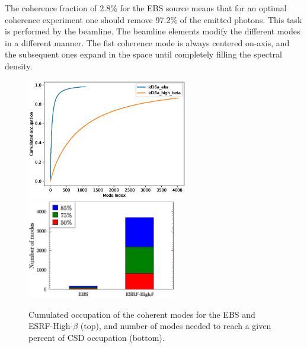 \documentclass{iucr}              %
\begin{document}
The coherence fraction of 2.8\% for the EBS source means that for an optimal coherence experiment one should remove 97.2\% of the emitted photons. This task is performed by the beamline. The beamline elements modify the different modes in a different manner. The fist coherence mode is always centered on-axis, and the subsequent ones expand in the space until completely filling the spectral density.   
\begin{figure}\label{fig:histomodes}
    \centering
        \includegraphics[width=7cm]{GRAPHICS/cumulated_occupation.eps}
        \includegraphics[width=6.5cm]{GRAPHICS/up_to_mode_id16a.eps}
    \caption{Cumulated occupation of the coherent modes for the EBS and ESRF-High-$\beta$ (top), and number of modes needed to reach a given percent of CSD occupation (bottom). }
\end{figure}
\end{document}
